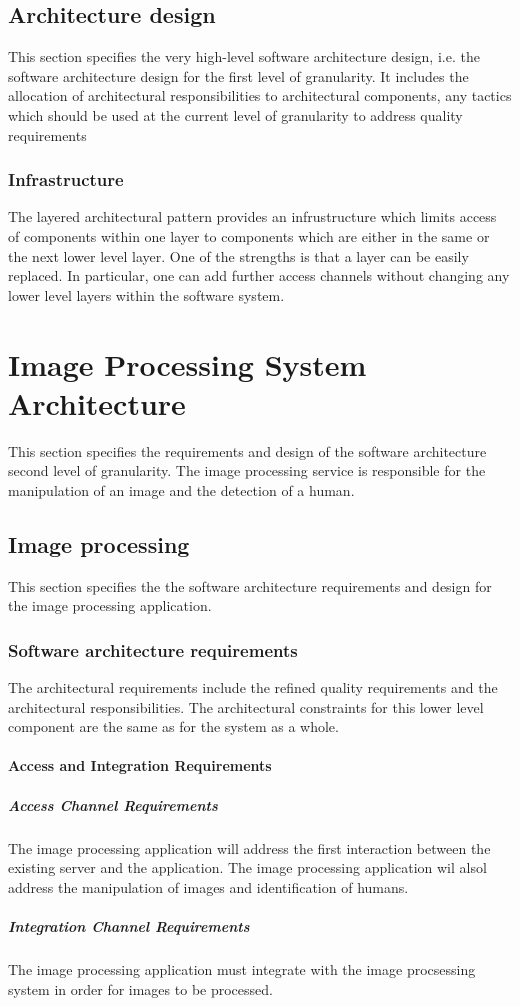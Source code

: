 \documentclass[a4paper,12pt]{report}
\begin{document}
\newpage

\subsection {Architecture design}
This section specifies the very high-level software architecture design, i.e. the software architecture
design for the first level of granularity. It includes the allocation of architectural responsibilities to
architectural components, any tactics which should be used at the current level of granularity to
address quality requirements

\subsubsection {Infrastructure}
The layered architectural pattern provides an infrustructure which limits access of components within one layer to components which are either in the same or the next lower level layer. One of the strengths is that a layer can be easily replaced. In particular, one can add further access channels without changing any lower level layers within the software system.


\section {Image Processing System Architecture}
This section specifies the requirements and design of the software architecture second level of granularity. The image processing service is responsible for the manipulation of an image and the detection of a human.

	\subsection {Image processing}
	This section specifies the the software architecture requirements and design for the image processing application.
		\subsubsection {Software architecture requirements}
		The architectural requirements include the refined quality requirements and the architectural responsibilities. The architectural constraints for this lower level component are the same as for the system as a whole.
		
			\paragraph {Access and Integration Requirements}
				\subparagraph {Access Channel Requirements}
					The  image processing application will address the first interaction between the existing server and the application.					The image processing application wil alsol address the manipulation of images and identification of humans.
				\subparagraph {Integration Channel Requirements}
					The  image processing application must integrate with the image procsessing system in order for images to be processed.	
			
\end{document}
